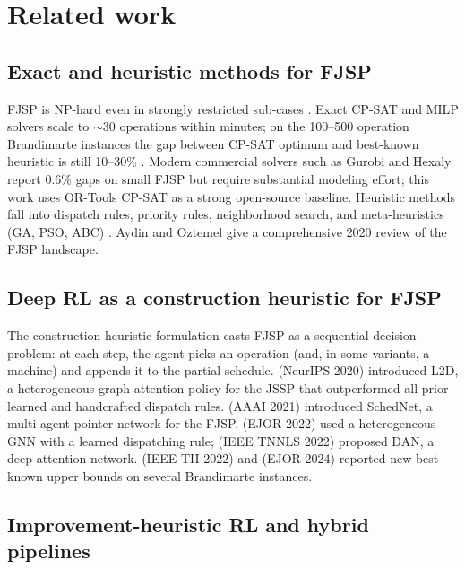 \documentclass[preprint,review,3p,times,twocolumn]{elsarticle}
\begin{document}
\section{Related work}
\label{sec:related}

\subsection{Exact and heuristic methods for FJSP}

FJSP is NP-hard even in strongly restricted sub-cases
\citep{Garey1976}. Exact CP-SAT and MILP solvers scale to
$\sim$30 operations within minutes; on the 100--500
operation Brandimarte instances the gap between CP-SAT
optimum and best-known heuristic is still 10--30\%
\citep{Bert2019}. Modern commercial solvers such as Gurobi
and Hexaly report 0.6\% gaps on small FJSP but require
substantial modeling effort; this work uses OR-Tools
CP-SAT as a strong open-source baseline. Heuristic methods
fall into dispatch rules, priority rules, neighborhood
search, and meta-heuristics (GA, PSO, ABC) \citep{Brucker1994}.
Aydin and Oztemel \citeyearpar{Aydin2000} give a comprehensive
2020 review of the FJSP landscape.

\subsection{Deep RL as a construction heuristic for FJSP}

The construction-heuristic formulation casts FJSP as a
sequential decision problem: at each step, the agent picks
an operation (and, in some variants, a machine) and
appends it to the partial schedule. \citet{Zhang2020L2D}
(NeurIPS 2020) introduced L2D, a heterogeneous-graph
attention policy for the JSSP that outperformed all
prior learned and handcrafted dispatch rules.
\citet{Park2021} (AAAI 2021) introduced SchedNet, a
multi-agent pointer network for the FJSP.
\citet{Lei2022} (EJOR 2022) used a heterogeneous
GNN with a learned dispatching rule; \citet{Wang2022DAN}
(IEEE TNNLS 2022) proposed DAN, a deep attention network.
\citet{Song2022TII} (IEEE TII 2022) and
\citet{Yang2024} (EJOR 2024) reported new best-known
upper bounds on several Brandimarte instances.

\subsection{Improvement-heuristic RL and hybrid pipelines}
\end{document}
